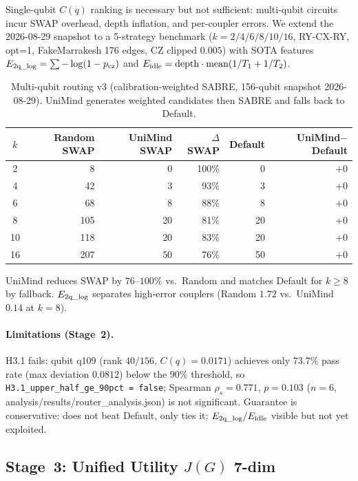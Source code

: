 ﻿\documentclass[12pt,a4paper]{article}
\begin{document}
Single-qubit $C(q)$ ranking is necessary but not
sufficient: multi-qubit circuits incur SWAP overhead,
depth inflation, and per-coupler errors. We extend
the 2026-08-29 snapshot to a 5-strategy benchmark
($k=2/4/6/8/10/16$, RY-CX-RY, opt=1, FakeMarrakesh
176 edges, CZ clipped $0.005$) with SOTA features
$E_{\rm 2q\_log}=\sum -\log(1-p_{\rm cz})$
and $E_{\rm idle}={\rm depth}\cdot{\rm mean}(1/T_1+1/T_2)$.

\begin{table}[H]
\centering
\caption{Multi-qubit routing v3 (calibration-weighted SABRE,
156-qubit snapshot 2026-08-29). UniMind generates
weighted candidates then SABRE and falls back to Default.}
\label{tab:routing_mq}
\small
\begin{tabular}{@{}crrrrr@{}}
\hline
$k$ & Random SWAP & UniMind SWAP & $\Delta$SWAP & Default & UniMind$-$Default \\
\hline
2 & 8 & 0 & 100\% & 0 & +0 \\
4 & 42 & 3 & 93\% & 3 & +0 \\
6 & 68 & 8 & 88\% & 8 & +0 \\
8 & 105 & 20 & 81\% & 20 & +0 \\
10 & 118 & 20 & 83\% & 20 & +0 \\
16 & 207 & 50 & 76\% & 50 & +0 \\
\hline
\end{tabular}
\end{table}

UniMind reduces SWAP by $76$--$100\%$ vs.\ Random
and matches Default for $k\ge 8$ by fallback.
$E_{\rm 2q\_log}$ separates high-error couplers
(Random $1.72$ vs.\ UniMind $0.14$ at $k=8$).

\paragraph{Limitations (Stage~2).} H3.1 fails: qubit q109 (rank $40/156$, $C(q)=0.0171$) achieves only $73.7\%$ pass rate (max deviation $0.0812$) below the $90\%$ threshold, so \texttt{H3.1\_upper\_half\_ge\_90pct = false}; Spearman $\rho_s=0.771$, $p=0.103$ ($n{=}6$, analysis/results/router\_analysis.json) is not significant. Guarantee is conservative:
does not beat Default, only ties it; $E_{\rm 2q\_log}/E_{\rm idle}$
visible but not yet exploited.

\subsection{Stage~3: Unified Utility $J(G)$ 7-dim}\label{sec:routing_utility}
\end{document}
